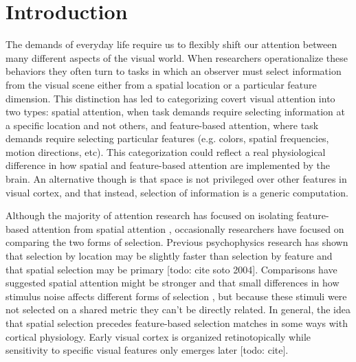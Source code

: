 
\section{Introduction}

The demands of everyday life require us to flexibly shift our attention between many different aspects of the visual world. When researchers operationalize these behaviors they often turn to tasks in which an observer must select information from the visual scene either from a spatial location or a particular feature dimension. This distinction has led to categorizing covert visual attention into two types: spatial attention, when task demands require selecting information at a specific location and not others, and feature-based attention, where task demands require selecting particular features (e.g. colors, spatial frequencies, motion directions, etc). This categorization could reflect a real physiological difference in how spatial and feature-based attention are implemented by the brain. An alternative though is that space is not privileged over other features in visual cortex, and that instead, selection of information is a generic computation.

Although the majority of attention research has focused on isolating feature-based attention from spatial attention \citep{Saenz2002-fs}, occasionally researchers have focused on comparing the two forms of selection. Previous psychophysics research has shown that selection by location may be slightly faster than selection by feature \citep{Liu2007-ed} and that spatial selection may be primary [todo: cite soto 2004]. Comparisons have suggested spatial attention might be stronger and that small differences in how stimulus noise affects different forms of selection \citep{Ling2009-rq}, but because these stimuli were not selected on a shared metric they can't be directly related. In general, the idea that spatial selection precedes feature-based selection matches in some ways with cortical physiology. Early visual cortex is organized retinotopically \citep{Wandell2007-pr} while sensitivity to specific visual features only emerges later [todo: cite]. 

